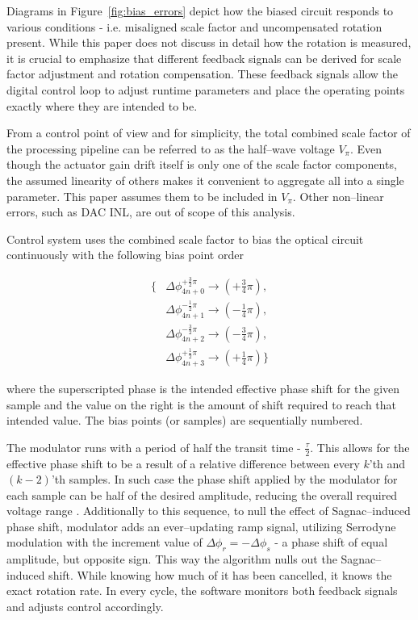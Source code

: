 \documentclass[journal,twoside,web]{ieeecolor}
\begin{document}
Diagrams in Figure~\ref{fig:bias_errors} depict how the biased circuit responds to various conditions - i.e. misaligned scale factor and uncompensated rotation present. While this paper does not discuss in detail how the rotation is measured, it is crucial to emphasize that different feedback signals can be derived for scale factor adjustment and rotation compensation. These feedback signals allow the digital control loop to adjust runtime parameters and place the operating points exactly where they are intended to be.

From a control point of view and for simplicity, the total combined scale factor of the processing pipeline can be referred to as the half--wave voltage $V_{\pi}$. Even though the actuator gain drift itself is only one of the scale factor components, the assumed linearity of others makes it convenient to aggregate all into a single parameter. This paper assumes them to be included in $V_{\pi}$. Other non--linear errors, such as DAC INL, are out of scope of this analysis. 

\noindent
Control system uses the combined scale factor to bias the optical circuit continuously with the following bias point order

\begin{equation}
    \begin{split}
        \{ & \Delta\phi_{4n+0}^{+\frac{3}{2}\pi} \rightarrow (+\frac{3}{4}\pi),    \\
           & \Delta\phi_{4n+1}^{-\frac{1}{2}\pi} \rightarrow (-\frac{1}{4}\pi),    \\
           & \Delta\phi_{4n+2}^{-\frac{3}{2}\pi} \rightarrow (-\frac{3}{4}\pi),    \\
           & \Delta\phi_{4n+3}^{+\frac{1}{2}\pi} \rightarrow (+\frac{1}{4}\pi) \}
    \end{split}
    \label{eq:bias_order}
\end{equation}

\noindent
where the superscripted phase is the intended effective phase shift for the given sample and the value on the right is the amount of shift required to reach that intended value. The bias points (or samples) are sequentially numbered.

The modulator runs with a period of half the transit time - $\frac{\tau}{2}$. This allows for the effective phase shift to be a result of a relative difference between every $k$'th and $(k-2)$'th samples. In such case the phase shift applied by the modulator for each sample can be half of the desired amplitude, reducing the overall required voltage range \cite{lefevre1993fiber}. Additionally to this sequence, to null the effect of Sagnac--induced phase shift, modulator adds an ever--updating ramp signal, utilizing Serrodyne modulation \cite{pavlath1996closed} with the increment value of $\Delta\phi_r = -\Delta\phi_s$ - a phase shift of equal amplitude, but opposite sign. This way the algorithm nulls out the Sagnac--induced shift. While knowing how much of it has been cancelled, it knows the exact rotation rate. In every cycle, the software monitors both feedback signals and adjusts control accordingly.
\end{document}
